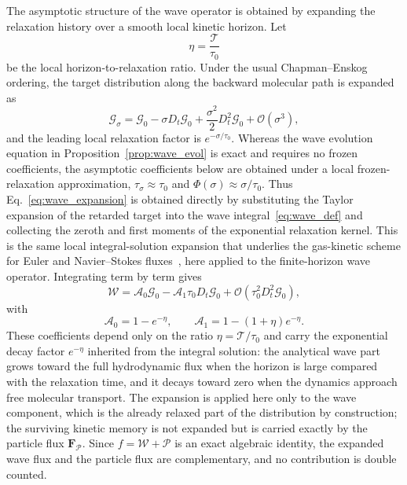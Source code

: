 \documentclass[preprint,12pt]{elsarticle}
\begin{document}
The asymptotic structure of the wave operator is obtained by expanding the relaxation history over a smooth local kinetic horizon. Let
\begin{equation}
    \eta=\frac{\mathcal{T}}{\tau_0}
\end{equation}
be the local horizon-to-relaxation ratio. Under the usual Chapman--Enskog ordering, the target distribution along the backward molecular path is expanded as
\begin{equation}
    \mathcal{G}_\sigma
    =
    \mathcal{G}_0-\sigma D_t\mathcal{G}_0
    +\frac{\sigma^2}{2}D_t^2\mathcal{G}_0
    +\mathcal O(\sigma^3),
\end{equation}
and the leading local relaxation factor is $e^{-\sigma/\tau_0}$. Whereas the wave evolution equation in Proposition~\ref{prop:wave_evol} is exact and requires no frozen coefficients, the asymptotic coefficients below are obtained under a local frozen-relaxation approximation, $\tau_\sigma\approx\tau_0$ and $\Phi(\sigma)\approx\sigma/\tau_0$. Thus Eq.~\eqref{eq:wave_expansion} is obtained directly by substituting the Taylor expansion of the retarded target into the wave integral~\eqref{eq:wave_def} and collecting the zeroth and first moments of the exponential relaxation kernel. This is the same local integral-solution expansion that underlies the gas-kinetic scheme for Euler and Navier--Stokes fluxes~\cite{xu2001gks}, here applied to the finite-horizon wave operator. Integrating term by term gives
\begin{equation}\label{eq:wave_expansion}
    \mathcal{W}
    =
    \mathcal A_0\mathcal{G}_0
    -\mathcal A_1\tau_0D_t\mathcal{G}_0
    +\mathcal O(\tau_0^2D_t^2\mathcal{G}_0),
\end{equation}
with
\begin{equation}\label{eq:A_coefficients}
    \mathcal A_0=1-e^{-\eta},\qquad
    \mathcal A_1=1-(1+\eta)e^{-\eta}.
\end{equation}
These coefficients depend only on the ratio $\eta=\mathcal{T}/\tau_0$ and carry the exponential decay factor $e^{-\eta}$ inherited from the integral solution: the analytical wave part grows toward the full hydrodynamic flux when the horizon is large compared with the relaxation time, and it decays toward zero when the dynamics approach free molecular transport. The expansion is applied here only to the wave component, which is the already relaxed part of the distribution by construction; the surviving kinetic memory is not expanded but is carried exactly by the particle flux $\mathbf F_{\mathcal{P}}$. Since $f=\mathcal{W}+\mathcal{P}$ is an exact algebraic identity, the expanded wave flux and the particle flux are complementary, and no contribution is double counted.
\end{document}
